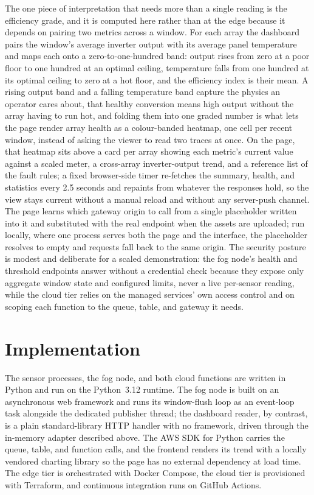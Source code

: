 \documentclass[conference]{IEEEtran}
\begin{document}
The one piece of interpretation that needs more than a single reading is the efficiency grade, and it is computed here rather than at the edge because it depends on pairing two metrics across a window. For each array the dashboard pairs the window's average inverter output with its average panel temperature and maps each onto a zero-to-one-hundred band: output rises from zero at a poor floor to one hundred at an optimal ceiling, temperature falls from one hundred at its optimal ceiling to zero at a hot floor, and the efficiency index is their mean. A rising output band and a falling temperature band capture the physics an operator cares about, that healthy conversion means high output without the array having to run hot, and folding them into one graded number is what lets the page render array health as a colour-banded heatmap, one cell per recent window, instead of asking the viewer to read two traces at once. On the page, that heatmap sits above a card per array showing each metric's current value against a scaled meter, a cross-array inverter-output trend, and a reference list of the fault rules; a fixed browser-side timer re-fetches the summary, health, and statistics every 2.5 seconds and repaints from whatever the responses hold, so the view stays current without a manual reload and without any server-push channel. The page learns which gateway origin to call from a single placeholder written into it and substituted with the real endpoint when the assets are uploaded; run locally, where one process serves both the page and the interface, the placeholder resolves to empty and requests fall back to the same origin. The security posture is modest and deliberate for a scaled demonstration: the fog node's health and threshold endpoints answer without a credential check because they expose only aggregate window state and configured limits, never a live per-sensor reading, while the cloud tier relies on the managed services' own access control and on scoping each function to the queue, table, and gateway it needs.

\section{Implementation}

The sensor processes, the fog node, and both cloud functions are written in Python and run on the Python~3.12 runtime. The fog node is built on an asynchronous web framework and runs its window-flush loop as an event-loop task alongside the dedicated publisher thread; the dashboard reader, by contrast, is a plain standard-library HTTP handler with no framework, driven through the in-memory adapter described above. The AWS SDK for Python carries the queue, table, and function calls, and the frontend renders its trend with a locally vendored charting library so the page has no external dependency at load time. The edge tier is orchestrated with Docker Compose, the cloud tier is provisioned with Terraform, and continuous integration runs on GitHub Actions.
\end{document}
